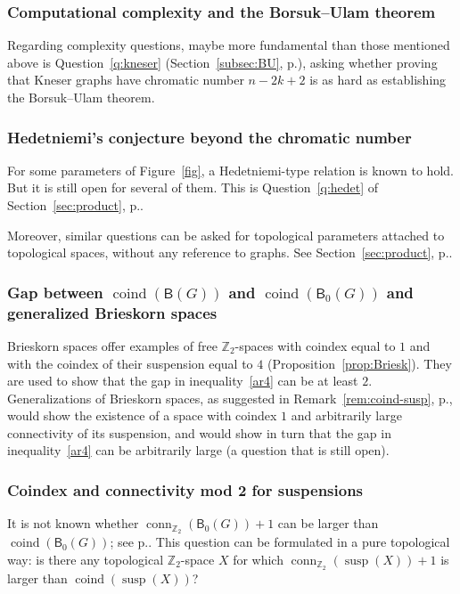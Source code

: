 \documentclass[12pt]{amsart}
\theoremstyle{definition}
\def\Z{\mathbb{Z}}
\def\B{\mathsf{B}}
\def\susp{\operatorname{susp}}
\def\conn{\operatorname{conn}}
\def\coind{\operatorname{coind}}
\begin{document}
\subsubsection*{Computational complexity and the Borsuk--Ulam theorem}
 Regarding complexity questions, maybe more fundamental than those mentioned above is Question~\ref{q:kneser} (Section~\ref{subsec:BU}, p.\pageref{q:kneser}), asking whether proving that Kneser graphs have chromatic number $n-2k+2$ is as hard as establishing the Borsuk--Ulam theorem.

\subsubsection*{Hedetniemi's conjecture beyond the chromatic number} For some parameters of Figure~\ref{fig}, a Hedetniemi-type relation is known to hold. But it is still open for several of them. This is Question~\ref{q:hedet} of Section~\ref{sec:product}, p.\pageref{page:hedet-paramG}. 

Moreover, similar questions can be asked for topological parameters attached to topological spaces, without any reference to graphs. See Section~\ref{sec:product}, p.\pageref{page:hedet-param-top}.

\subsubsection*{Gap between $\coind(\B(G))$ and $\coind(\B_0(G))$ and generalized Brieskorn spaces}
Brieskorn spaces offer examples of free $\Z_2$-spaces with coindex equal to $1$ and with the coindex of their suspension equal to $4$ (Proposition~\ref{prop:Briesk}). They are used to show that the gap in inequality~\eqref{ar4} can be at least $2$. Generalizations of Brieskorn spaces, as suggested in Remark~\ref{rem:coind-susp}, p.\pageref{rem:coind-susp}, would show the existence of a space with coindex $1$ and arbitrarily large connectivity of its suspension, and would show in turn that the gap in inequality~\eqref{ar4} can be arbitrarily large (a question that is still open).

\subsubsection*{Coindex and connectivity mod 2 for suspensions} It is not known whether $\conn_{\Z_2}(\B_0(G))+1$ can be larger than $\coind(\B_0(G))$; see p.\pageref{page:coind-conn2}. This question can be formulated in a pure topological way: is there any topological $\Z_2$-space $X$ for which $\conn_{\Z_2}(\susp(X))+1$ is larger than $\coind(\susp(X))$?
\end{document}

